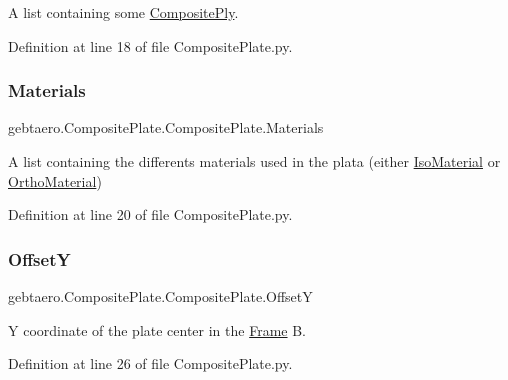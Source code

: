A list containing some \hyperlink{namespacegebtaero_1_1_composite_ply}{Composite\+Ply}. 



Definition at line 18 of file Composite\+Plate.\+py.

\mbox{\label{classgebtaero_1_1_composite_plate_1_1_composite_plate_a95f58eff2cdd77c45ccdca936c37c12a}} 
\subsubsection{\texorpdfstring{Materials}{Materials}}
{\footnotesize\ttfamily gebtaero.\+Composite\+Plate.\+Composite\+Plate.\+Materials}



A list containing the differents materials used in the plata (either \hyperlink{namespacegebtaero_1_1_iso_material}{Iso\+Material} or \hyperlink{namespacegebtaero_1_1_ortho_material}{Ortho\+Material}) 



Definition at line 20 of file Composite\+Plate.\+py.

\mbox{\label{classgebtaero_1_1_composite_plate_1_1_composite_plate_a33de8af0e1aaff88563310459b3b6f6b}} 
\subsubsection{\texorpdfstring{OffsetY}{OffsetY}}
{\footnotesize\ttfamily gebtaero.\+Composite\+Plate.\+Composite\+Plate.\+OffsetY}



Y coordinate of the plate center in the \hyperlink{namespacegebtaero_1_1_frame}{Frame} B. 



Definition at line 26 of file Composite\+Plate.\+py.

